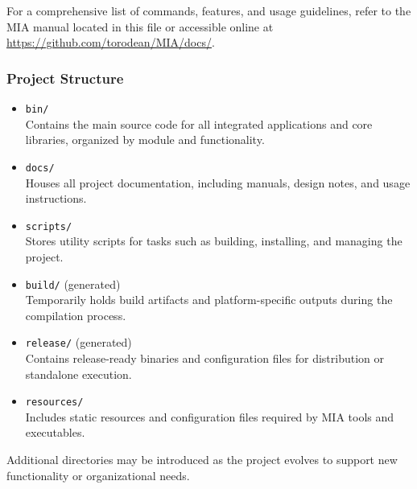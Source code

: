 For a comprehensive list of commands, features, and usage guidelines, refer to the MIA manual located in this file or accessible online at \url{https://github.com/torodean/MIA/docs/}.

\subsubsection*{Project Structure}

\begin{itemize}
	\item \texttt{bin/} \hfill \\ 
	Contains the main source code for all integrated applications and core libraries, organized by module and functionality.
	
	\item \texttt{docs/} \hfill \\ 
	Houses all project documentation, including manuals, design notes, and usage instructions.
	
	\item \texttt{scripts/} \hfill \\ 
	Stores utility scripts for tasks such as building, installing, and managing the project.
	
	\item \texttt{build/} (generated) \hfill \\ 
	Temporarily holds build artifacts and platform-specific outputs during the compilation process.
	
	\item \texttt{release/} (generated) \hfill \\ 
	Contains release-ready binaries and configuration files for distribution or standalone execution.
	
	\item \texttt{resources/} \hfill \\ 
	Includes static resources and configuration files required by MIA tools and executables.
\end{itemize}

Additional directories may be introduced as the project evolves to support new functionality or organizational needs.
